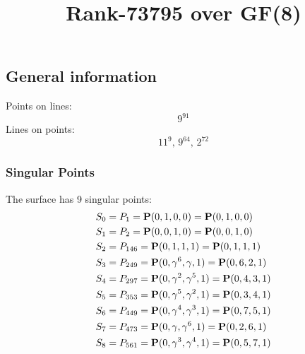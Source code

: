 \documentclass{article}
\newcommand\setTBstruts{\def\T{\rule{0pt}{2.6ex}}%
\def\B{\rule[-1.2ex]{0pt}{0pt}}}
\newcommand{\bP}{{\bf P}}
\begin{document}
 
\setTBstruts



{\allowdisplaybreaks%






\title{Rank-73795 over GF(8)}
\author{}%
\maketitle%
%
{}



\subsection*{General information}
Points on lines:
$$
9^{91}$$
Lines on points:
$$
11^9,\,9^{64},\,2^{72}$$
\subsubsection*{Singular Points}
The surface has 9 singular points:\\
\begin{align*}
S_{0} &= P_{1}=\bP(0, 1, 0, 0) = \bP(0, 1, 0, 0)\\
S_{1} &= P_{2}=\bP(0, 0, 1, 0) = \bP(0, 0, 1, 0)\\
S_{2} &= P_{146}=\bP(0, 1, 1, 1) = \bP(0, 1, 1, 1)\\
S_{3} &= P_{249}=\bP(0, \gamma^{6}, \gamma , 1) = \bP(0, 6, 2, 1)\\
S_{4} &= P_{297}=\bP(0, \gamma^{2}, \gamma^{5}, 1) = \bP(0, 4, 3, 1)\\
S_{5} &= P_{353}=\bP(0, \gamma^{5}, \gamma^{2}, 1) = \bP(0, 3, 4, 1)\\
S_{6} &= P_{449}=\bP(0, \gamma^{4}, \gamma^{3}, 1) = \bP(0, 7, 5, 1)\\
S_{7} &= P_{473}=\bP(0, \gamma , \gamma^{6}, 1) = \bP(0, 2, 6, 1)\\
S_{8} &= P_{561}=\bP(0, \gamma^{3}, \gamma^{4}, 1) = \bP(0, 5, 7, 1)\\
\end{align*}
}
\end{document}
